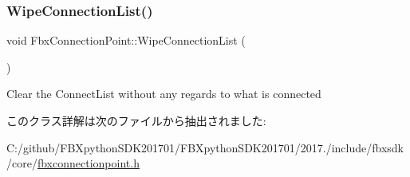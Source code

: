 \subsubsection{\texorpdfstring{Wipe\+Connection\+List()}{WipeConnectionList()}}
{\footnotesize\ttfamily void Fbx\+Connection\+Point\+::\+Wipe\+Connection\+List (\begin{DoxyParamCaption}{ }\end{DoxyParamCaption})}



Clear the Connect\+List without any regards to what is connected 



このクラス詳解は次のファイルから抽出されました\+:\begin{DoxyCompactItemize}
\item 
C\+:/github/\+F\+B\+Xpython\+S\+D\+K201701/\+F\+B\+Xpython\+S\+D\+K201701/2017./include/fbxsdk/core/\hyperlink{fbxconnectionpoint_8h}{fbxconnectionpoint.\+h}\end{DoxyCompactItemize}
